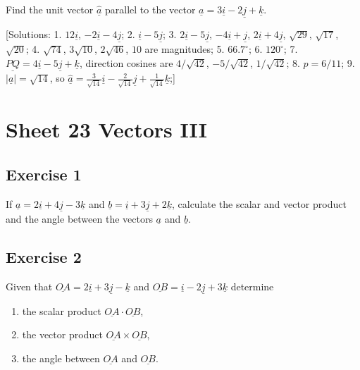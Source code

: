 \documentclass[
  11pt,
  oneside]{book}
\providecommand{\tightlist}{%
  \setlength{\itemsep}{0pt}\setlength{\parskip}{0pt}}
\newcommand{\slide}{}
\theoremstyle{definition}
\theoremstyle{definition}
\theoremstyle{definition}
\theoremstyle{definition}
\theoremstyle{remark}
\begin{document}
Find the unit vector \(\hat{\underline{a}}\) parallel to the vector \(\underline a=3\underline{i}-2\underline{j}+\underline{k}\).

{[}Solutions:
1. \(12\underline{i}\), \(-2\underline{i}-4\underline{j}\);
2. \(\underline{i}-5\underline{j}\);
3. \(2\underline{i}-5\underline{j}\), \(-4\underline{i}+\underline{j}\), \(2\underline{i}+4\underline{j}\), \(\sqrt{29}\), \(\sqrt{17}\), \(\sqrt{20}\);
4. \(\sqrt{74}\), \(3\sqrt{10}\), \(2\sqrt{46}\), \(10\) are magnitudes;
5. \(66.7^{\circ}\);
6. \(120^{\circ}\);
7. \(\underline{PQ}=4\underline{i}-5\underline{j}+\underline{k}\), direction cosines are \(4/\sqrt{42}\), \(-5/\sqrt{42}\), \(1/\sqrt{42}\);
8. \(p=6/11\);
9. \(|\underline{a}|=\sqrt{14}\), so \(\hat{\underline{a}}=\frac{3}{\sqrt{14}}\underline{i} - \frac{2}{\sqrt{14}}\underline{j} + \frac{1}{\sqrt{14}}\underline{k}\);{]}

\slide

\section{Sheet 23 Vectors III}\label{sheet-23-vectors-iii}

\subsection*{Exercise 1}\label{exercise-1-14}

If \(\underline{a} = 2\underline{i} + 4\underline{j} - 3\underline{k}\) and \(\underline{b} = \underline{i} + 3\underline{j} + 2\underline{k}\), calculate the scalar and vector product and the angle between the vectors \(\underline{a}\) and \(\underline{b}\).

\slide

\subsection*{Exercise 2}\label{exercise-2-14}

Given that \(\underline{OA} = 2\underline{i} + 3\underline{j} - \underline{k}\) and \(\underline{OB} = \underline{i} - 2\underline{j} + 3\underline{k}\) determine

\begin{enumerate}
\def\labelenumi{\roman{enumi}.}
\tightlist
\item
  the scalar product \(\underline{OA}\cdot\underline{OB}\),
\item
  the vector product \(\underline{OA}\times\underline{OB}\),
\item
  the angle between \(\underline{OA}\) and \(\underline{OB}\).
\end{enumerate}
\end{document}
